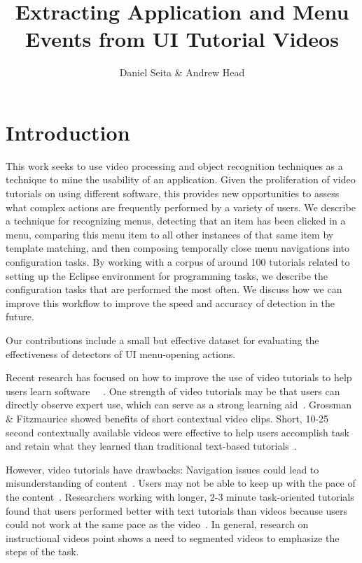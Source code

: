 \documentclass[10pt]{article}
\title{Extracting Application and Menu Events from UI Tutorial Videos}
\author{Daniel Seita \& Andrew Head}
\begin{document}
\maketitle

\section{Introduction}

This work seeks to use video processing and object recognition techniques as a technique to
mine the usability of an application.  Given the proliferation of video tutorials on using
different software, this provides new opportunities to assess what complex actions are frequently
performed by a variety of users.  We describe a technique for recognizing menus, detecting that an
item has been clicked in a menu, comparing this menu item to all other instances of that same item
by template matching, and then composing temporally close menu navigations into configuration tasks.
By working with a corpus of around 100 tutorials related to setting up the Eclipse environment for
programming tasks, we describe the configuration tasks that are performed the most often.  We
discuss how we can improve this workflow to improve the speed and accuracy of detection in the
future.

Our contributions include a small but effective dataset for evaluating the effectiveness of
detectors of UI menu-opening actions.

Recent research has focused on how to improve the use of video tutorials to help users learn
software ~\cite{matejka_ambient_2011}~\cite{pongnumkul_pause-and-play_2011}.  One strength of video
tutorials may be that users can directly observe expert use, which can serve as a strong learning
aid~\cite{shneiderman_direct_1983}.  Grossman \& Fitzmaurice showed benefits of short contextual
video clips.  Short, 10-25 second contextually available videos were effective to help users
accomplish task and retain what they learned than traditional text-based
tutorials~\cite{grossman_toolclips_2010}.

However, video tutorials have drawbacks: Navigation issues could lead to misunderstanding of
content~\cite{harrison_comparison_1995}.  Users may not be able to keep up with the pace of the
content~\cite{palmiter_evaluation_1991}.  Researchers working with longer, 2-3 minute task-oriented
tutorials found that users performed better with text tutorials than videos because users could not
work at the same pace as the video~\cite{grabler_generating_2009}.  In general, research on
instructional videos point shows a need to segmented videos to emphasize the steps of the task.
\end{document}
